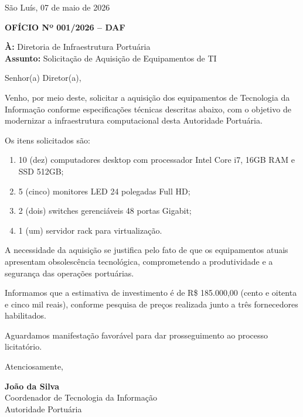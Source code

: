 \documentclass[12pt,a4paper]{article}
\begin{document}
\onehalfspacing

\vspace*{1.5cm}

\begin{flushright}
São Luís, 07 de maio de 2026
\end{flushright}

\vspace{0.5cm}

\textbf{OFÍCIO Nº 001/2026 -- DAF}

\vspace{1cm}

\textbf{À:} Diretoria de Infraestrutura Portuária\\
\textbf{Assunto:} Solicitação de Aquisição de Equipamentos de TI

\vspace{1cm}

Senhor(a) Diretor(a),

Venho, por meio deste, solicitar a aquisição dos equipamentos de Tecnologia da Informação conforme especificações técnicas descritas abaixo, com o objetivo de modernizar a infraestrutura computacional desta Autoridade Portuária.

Os itens solicitados são:

\begin{enumerate}
  \item 10 (dez) computadores desktop com processador Intel Core i7, 16GB RAM e SSD 512GB;
  \item 5 (cinco) monitores LED 24 polegadas Full HD;
  \item 2 (dois) switches gerenciáveis 48 portas Gigabit;
  \item 1 (um) servidor rack para virtualização.
\end{enumerate}

A necessidade da aquisição se justifica pelo fato de que os equipamentos atuais apresentam obsolescência tecnológica, comprometendo a produtividade e a segurança das operações portuárias.

Informamos que a estimativa de investimento é de R\$ 185.000,00 (cento e oitenta e cinco mil reais), conforme pesquisa de preços realizada junto a três fornecedores habilitados.

Aguardamos manifestação favorável para dar prosseguimento ao processo licitatório.

\vspace{1.5cm}

Atenciosamente,

\vspace{2cm}

\textbf{João da Silva}\\
Coordenador de Tecnologia da Informação\\
Autoridade Portuária
\end{document}
